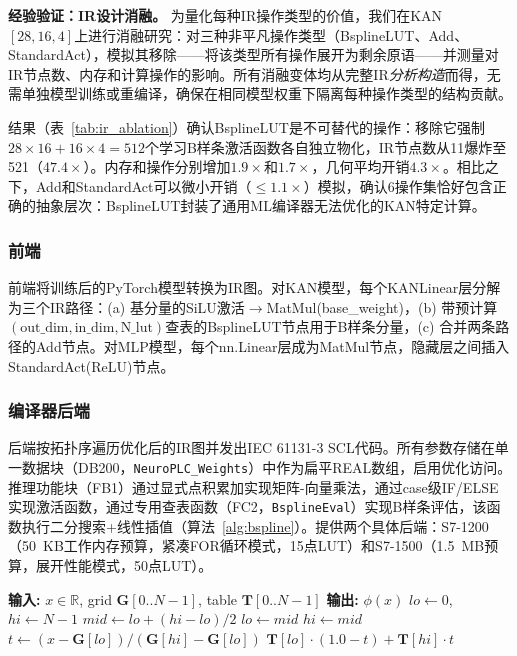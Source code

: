 \documentclass[journal,onecolumn]{IEEEtran}
\theoremstyle{definition}
\theoremstyle{plain}
\theoremstyle{remark}
\begin{document}
\vspace{2pt}
\noindent\textbf{经验验证：IR设计消融。}
为量化每种IR操作类型的价值，我们在KAN $[28,16,4]$上进行消融研究：对三种非平凡操作类型（BsplineLUT、Add、StandardAct），模拟其移除——将该类型所有操作展开为剩余原语——并测量对IR节点数、内存和计算操作的影响。所有消融变体均从完整IR\textit{分析构造}而得，无需单独模型训练或重编译，确保在相同模型权重下隔离每种操作类型的结构贡献。

结果（表~\ref{tab:ir_ablation}）确认BsplineLUT是不可替代的操作：移除它强制$28\times16 + 16\times4 = 512$个学习B样条激活函数各自独立物化，IR节点数从11爆炸至521（$47.4\times$）。内存和操作分别增加$1.9\times$和$1.7\times$，几何平均开销$4.3\times$。相比之下，Add和StandardAct可以微小开销（$\leq 1.1\times$）模拟，确认6操作集恰好包含正确的抽象层次：BsplineLUT封装了通用ML编译器无法优化的KAN特定计算。

\subsubsection{前端}

前端将训练后的PyTorch模型转换为IR图。对KAN模型，每个KANLinear层分解为三个IR路径：(a) 基分量的SiLU激活$\rightarrow$MatMul(base\_weight)，(b) 带预计算$(\text{out\_dim},\text{in\_dim},\text{N\_lut})$查表的BsplineLUT节点用于B样条分量，(c) 合并两条路径的Add节点。对MLP模型，每个nn.Linear层成为MatMul节点，隐藏层之间插入StandardAct(ReLU)节点。

\subsubsection{编译器后端}

后端按拓扑序遍历优化后的IR图并发出IEC 61131-3 SCL代码。所有参数存储在单一数据块（DB200，\texttt{NeuroPLC\_Weights}）中作为扁平REAL数组，启用优化访问。推理功能块（FB1）通过显式点积累加实现矩阵-向量乘法，通过case级IF/ELSE实现激活函数，通过专用查表函数（FC2，\texttt{BsplineEval}）实现B样条评估，该函数执行二分搜索+线性插值（算法~\ref{alg:bspline}）。提供两个具体后端：S7-1200（50~KB工作内存预算，紧凑FOR循环模式，15点LUT）和S7-1500（1.5~MB预算，展开性能模式，50点LUT）。

\begin{algorithm}[!t]
\caption{B样条查表评估（SCL: FC2）}
\label{alg:bspline}
\begin{algorithmic}[1]
\State \textbf{输入:} $x \in \mathbb{R}$, grid $\mathbf{G}[0..N-1]$, table $\mathbf{T}[0..N-1]$
\State \textbf{输出:} $\phi(x)$
\State $lo \gets 0$, $hi \gets N-1$
    \State $mid \gets lo + (hi - lo) / 2$
     $lo \gets mid$ \Else $hi \gets mid$ \EndIf
\EndWhile
\State $t \gets (x - \mathbf{G}[lo]) / (\mathbf{G}[hi] - \mathbf{G}[lo])$
\State \Return $\mathbf{T}[lo] \cdot (1.0 - t) + \mathbf{T}[hi] \cdot t$
\end{algorithmic}
\end{algorithm}
\end{document}
